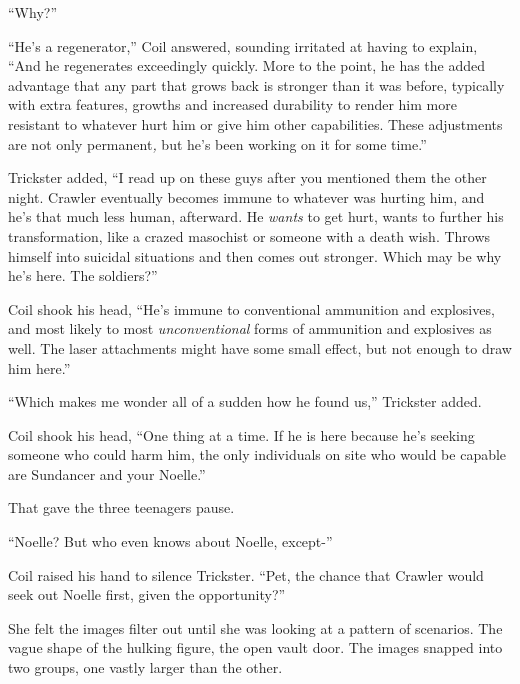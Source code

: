 ``Why?''



``He's a regenerator,'' Coil answered, sounding irritated at having to explain, ``And he regenerates exceedingly quickly.  More to the point, he has the added advantage that any part that grows back is stronger than it was before, typically with extra features, growths and increased durability to render him more resistant to whatever hurt him or give him other capabilities.  These adjustments are not only permanent\emph{, }but he's been working on it for some time.''



Trickster added, ``I read up on these guys after you mentioned them the other night.  Crawler eventually becomes immune to whatever was hurting him, and he's that much less human, afterward.  He \emph{wants} to get hurt, wants to further his transformation, like a crazed masochist or someone with a death wish.  Throws himself into suicidal situations and then comes out stronger.  Which may be why he's here.  The soldiers?''



Coil shook his head, ``He's immune to conventional ammunition and explosives, and most likely to most \emph{unconventional} forms of ammunition and explosives as well.  The laser attachments might have some small effect, but not enough to draw him here.''



``Which makes me wonder all of a sudden how he found us,'' Trickster added.



Coil shook his head, ``One thing at a time.  If he is here because he's seeking someone who could harm him, the only individuals on site who would be capable are Sundancer and your Noelle.''



That gave the three teenagers pause.



``Noelle?  But who even knows about Noelle, except-''



Coil raised his hand to silence Trickster.  ``Pet, the chance that Crawler would seek out Noelle first, given the opportunity?''



She felt the images filter out until she was looking at a pattern of scenarios.  The vague shape of the hulking figure, the open vault door.  The images snapped into two groups, one vastly larger than the other.



